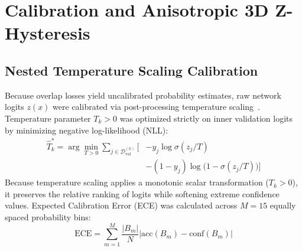 \documentclass[preprint,3p,times,onecolumn]{elsarticle}
\begin{document}
\section{Calibration and Anisotropic 3D Z-Hysteresis}
\label{sec:calibration_hysteresis}

\subsection{Nested Temperature Scaling Calibration}
Because overlap losses yield uncalibrated probability estimates, raw network logits $z(x)$ were calibrated via post-processing temperature scaling~\cite{guo2017calibration}. Temperature parameter $T_k > 0$ was optimized strictly on inner validation logits by minimizing negative log-likelihood (NLL):
\begin{equation}
\begin{aligned}
\hat{T}_k^* = \arg\min_{T > 0} \sum_{j \in \mathcal{D}_{\text{val}}^{(k)}} \Big[ &-y_j \log \sigma(z_j / T) \\
&-(1 - y_j) \log \big(1 - \sigma(z_j / T)\big) \Big]
\end{aligned}
\end{equation}
Because temperature scaling applies a monotonic scalar transformation ($T_k > 0$), it preserves the relative ranking of logits while softening extreme confidence values. Expected Calibration Error (ECE) was calculated across $M = 15$ equally spaced probability bins:
\begin{equation}
\text{ECE} = \sum_{m=1}^M \frac{|B_m|}{N} \left| \text{acc}(B_m) - \text{conf}(B_m) \right|
\end{equation}
\end{document}

